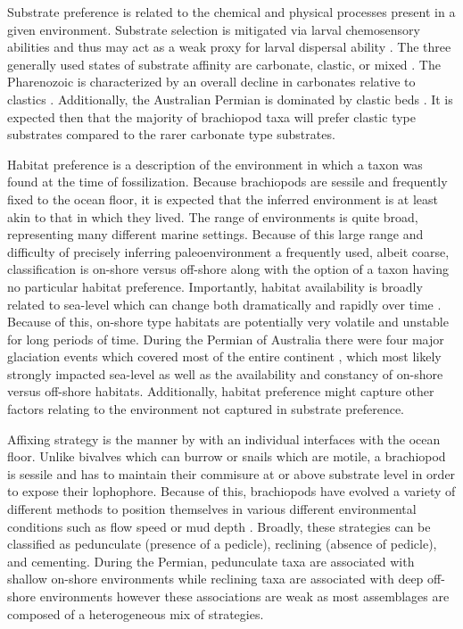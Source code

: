 \documentclass[12pt,letterpaper]{article}
\begin{document}
Substrate preference is related to the chemical and physical processes present in a given environment. Substrate selection is mitigated via larval chemosensory abilities and thus may act as a weak proxy for larval dispersal ability \citep{Jablonski2006a,Jablonski1983}. The three generally used states of substrate affinity are carbonate, clastic, or mixed \citep{Foote2006,Anderson2011a,Nurnberg2013a,Kiessling2007a,Miller2001}. The Pharenozoic is characterized by an overall decline in carbonates relative to clastics \citep{Foote2006,Miller2001}. Additionally, the Australian Permian is dominated by clastic beds \citep{Birgenheier2010,Percival2012,Thomas2007,Fielding2008a,Fielding2008}. It is expected then that the majority of brachiopod taxa will prefer clastic type substrates compared to the rarer carbonate type substrates.

Habitat preference is a description of the environment in which a taxon was found at the time of fossilization. Because brachiopods are sessile and frequently fixed to the ocean floor, it is expected that the inferred environment is at least akin to that in which they lived. The range of environments is quite broad, representing many different marine settings. Because of this large range and difficulty of precisely inferring paleoenvironment a frequently used, albeit coarse, classification is on-shore versus off-shore \citep{Sepkoski1991,Kiessling2007a,Bottjer1988,Jablonski1991,Jablonski1983b} along with the option of a taxon having no particular habitat preference. Importantly, habitat availability is broadly related to sea-level which can change both dramatically and rapidly over time \citep{Olszewski2004}. Because of this, on-shore type habitats are potentially very volatile and unstable for long periods of time. During the Permian of Australia there were four major glaciation events which covered most of the entire continent \citep{Fielding2008,Birgenheier2010,Fielding2008a,Fielding2006}, which most likely strongly impacted sea-level as well as the availability and constancy of on-shore versus off-shore habitats. Additionally, habitat preference might capture other factors relating to the environment not captured in substrate preference. 

Affixing strategy is the manner by with an individual interfaces with the ocean floor. Unlike bivalves which can burrow or snails which are motile, a brachiopod is sessile and has to maintain their commisure at or above substrate level in order to expose their lophophore. Because of this, brachiopods have evolved a variety of different methods to position themselves in various different environmental conditions such as flow speed or mud depth \citep{Rudwick1970,Alexander1977,LaBarbera1978,LaBarbera1981,Richardson1997}. Broadly, these strategies can be classified as pedunculate (presence of a pedicle), reclining (absence of pedicle), and cementing. During the Permian, pedunculate taxa are associated with shallow on-shore environments while reclining taxa are associated with deep off-shore environments \citep{Clapham2007} however these associations are weak as most assemblages are composed of a heterogeneous mix of strategies.
\end{document}
